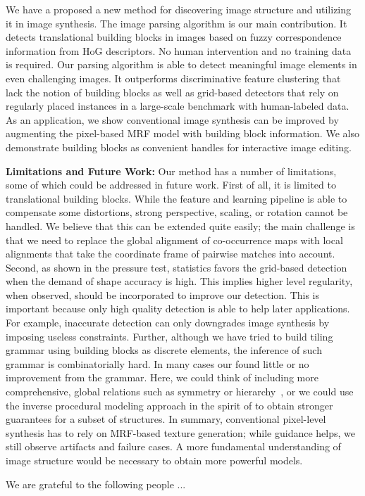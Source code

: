 \documentclass{acmtog}
\begin{document}
We have a proposed a new method for discovering image structure and utilizing it in image synthesis. The image parsing algorithm is our main contribution. It detects translational building blocks in images based on fuzzy correspondence information from HoG descriptors. No human intervention and no training data is required. Our parsing algorithm is able to detect meaningful image elements in even challenging images. It outperforms discriminative feature clustering that lack the notion of building blocks as well as grid-based detectors that rely on regularly placed instances in a large-scale benchmark with human-labeled data. As an application, we show conventional image synthesis can be improved by augmenting the pixel-based MRF model with building block information. We also demonstrate building blocks as convenient handles for interactive image editing. 

\textbf{Limitations and Future Work:} Our method has a number of limitations, some of which could be addressed in future work. First of all, it is limited to translational building blocks. While the feature and learning pipeline is able to compensate some distortions, strong perspective, scaling, or rotation cannot be handled. We believe that this can be extended quite easily; the main challenge is that we need to replace the global alignment of co-occurrence maps with local alignments that take the coordinate frame of pairwise matches into account. Second, as shown in the pressure test, statistics favors the grid-based detection when the demand of shape accuracy is high. This implies higher level regularity, when observed, should be incorporated to improve our detection. This is important because only high quality detection is able to help later applications. For example, inaccurate detection can only downgrades image synthesis by imposing useless constraints. Further, although we have tried to build tiling grammar using building blocks as discrete elements, the inference of such grammar is combinatorially hard. In many cases our found little or no improvement from the grammar. Here, we could think of including more comprehensive, global relations such as symmetry or hierarchy~\cite{Hu2013PPI}, or we could use the inverse procedural modeling approach in the spirit of \cite{BOKELOHsig2010,Sylvain2010AT} to obtain stronger guarantees for a subset of structures. In summary, conventional pixel-level synthesis has to rely on MRF-based texture generation; while guidance helps, we still observe artifacts and failure cases. A more fundamental understanding of image structure would be necessary to obtain more powerful models.

\begin{acks}
We are grateful to the following people ... 
\end{acks}





\end{document}
